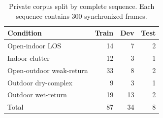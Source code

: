 \begin{table}[t]
\centering\small
\caption{Private corpus split by complete sequence. Each sequence contains 300 synchronized frames.}
\label{tab:protocol}
\begin{tabular}{lrrr}
\toprule
Condition & Train & Dev & Test\\
\midrule
Open-indoor LOS &14&7&2\\
Indoor clutter &12&3&1\\
Open-outdoor weak-return &33&8&2\\
Outdoor dry-complex &9&3&1\\
Outdoor wet-return &19&13&2\\
\midrule
Total &87&34&8\\
\bottomrule
\end{tabular}
\end{table}
